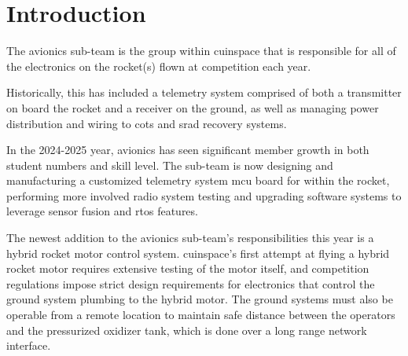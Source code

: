 \section{Introduction}

The avionics sub-team is the group within \gls{cuinspace} that is responsible for all of the electronics on the
rocket(s) flown at competition each year.

Historically, this has included a telemetry system comprised of both a transmitter on board the rocket and a receiver
on the ground, as well as managing power distribution and wiring to \gls{cots} and \gls{srad} recovery systems.

In the 2024-2025 year, avionics has seen significant member growth in both student numbers and skill level. The
sub-team is now designing and manufacturing a customized telemetry system \gls{mcu} board for within the rocket,
performing more involved radio system testing and upgrading software systems to leverage sensor fusion and \gls{rtos}
features.

The newest addition to the avionics sub-team's responsibilities this year is a hybrid rocket motor control system.
\gls{cuinspace}'s first attempt at flying a hybrid rocket motor requires extensive testing of the motor itself, and
competition regulations impose strict design requirements for electronics that control the ground system plumbing to
the hybrid motor. The ground systems must also be operable from a remote location to maintain safe distance between the
operators and the pressurized oxidizer tank, which is done over a long range network interface.
